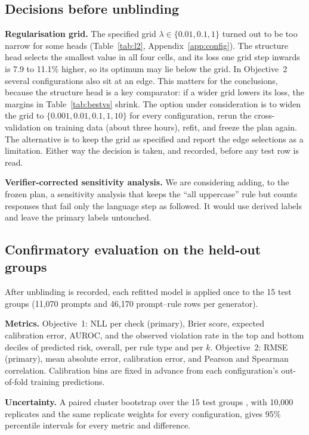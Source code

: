 \documentclass[10pt]{article}
\begin{document}
\subsection{Decisions before unblinding}

\textbf{Regularisation grid.} The specified grid $\lambda\in\{0.01, 0.1, 1\}$ turned out to be too narrow for some
heads (Table~\ref{tab:l2}, Appendix~\ref{app:config}). The structure head selects the smallest value in all four
cells, and its loss one grid step inwards is 7.9 to 11.1\% higher, so its optimum may lie below the grid. In
Objective~2 several configurations also sit at an edge. This matters for the conclusions, because the structure head is
a key comparator: if a wider grid lowers its loss, the margins in Table~\ref{tab:bestvs} shrink. The option under
consideration is to widen the grid to $\{0.001, 0.01, 0.1, 1, 10\}$ for every configuration, rerun the
cross-validation on training data (about three hours), refit, and freeze the plan again. The alternative is to keep
the grid as specified and report the edge selections as a limitation. Either way the decision is taken, and recorded,
before any test row is read.

\textbf{Verifier-corrected sensitivity analysis.} We are considering adding, to the frozen plan, a sensitivity analysis
that keeps the ``all uppercase'' rule but counts responses that fail only the language step as followed. It would use
derived labels and leave the primary labels untouched.

\subsection{Confirmatory evaluation on the held-out groups}

After unblinding is recorded, each refitted model is applied once to the 15 test groups (11,070 prompts and 46,170
prompt--rule rows per generator).

\textbf{Metrics.} Objective~1: NLL per check (primary), Brier score, expected calibration error, AUROC, and the observed
violation rate in the top and bottom deciles of predicted risk, overall, per rule type and per $k$. Objective~2: RMSE
(primary), mean absolute error, calibration error, and Pearson and Spearman correlation. Calibration bins are fixed in
advance from each configuration's out-of-fold training predictions.

\textbf{Uncertainty.} A paired cluster bootstrap over the 15 test groups \citep{efron1979bootstrap}, with 10,000
replicates and the same replicate weights for every configuration, gives 95\% percentile intervals for every metric
and difference.
\end{document}
